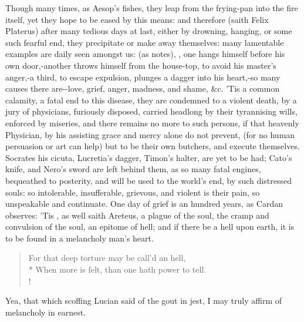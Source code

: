 Though many times, as Aesop's fishes, they leap from the frying-pan
into the fire itself, yet they hope to be eased by this means: and
therefore (saith Felix Platerus) after many tedious days at last,
either by drowning, hanging, or some such fearful end, they precipitate
or make away themselves: many lamentable examples are daily seen
amongst us:  (as \Seneca{} notes),
, one hangs himself
before his own door,-another throws himself from the house-top, to
avoid his master's anger,-a third, to escape expulsion, plunges a
dagger into his heart,-so many causes there are--love, grief, anger, madness, and shame, \&c. 'Tis a common
calamity, a fatal end to this disease, they are condemned to a
violent death, by a jury of physicians, furiously disposed, carried
headlong by their tyrannising wills, enforced by miseries, and there
remains no more to such persons, if that heavenly Physician, by his
assisting grace and mercy alone do not prevent, (for no human
persuasion or art can help) but to be their own butchers, and execute
themselves. Socrates his cicuta, Lucretia's dagger, Timon's halter, are
yet to be had; Cato's knife, and Nero's sword are left behind them, as
so many fatal engines, bequeathed to posterity, and will be used to the
world's end, by such distressed souls: so intolerable, insufferable,
grievous, and violent is their pain, so unspeakable and
continuate. One day of grief is an hundred years, as Cardan observes:
'Tis , as well saith Areteus, a plague
of the soul, the cramp and convulsion of the soul, an epitome of hell;
and if there be a hell upon earth, it is to be found in a melancholy
man's heart.

\begin{verse}%
For that deep torture may be call'd an hell,\\*
When more is felt, than one hath power to tell.\\!
\end{verse}%

Yea, that which scoffing Lucian said of the gout in jest, I may truly
affirm of melancholy in earnest.

